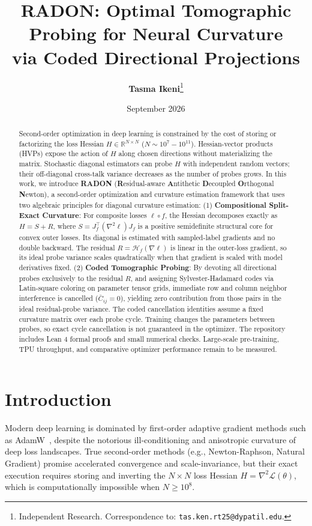 \documentclass[11pt,a4paper]{article}
\title{\textbf{RADON: Optimal Tomographic Probing for Neural Curvature\\via Coded Directional Projections}}
\author{
  \textbf{Tasma Ikeni}\thanks{Independent Research. Correspondence to: \texttt{tas.ken.rt25@dypatil.edu}.}
}
\date{September 2026}
\theoremstyle{definition}
\theoremstyle{remark}
\begin{document}
\maketitle

\begin{abstract}
Second-order optimization in deep learning is constrained by the cost of storing or factorizing the loss Hessian $H \in \mathbb{R}^{N \times N}$ ($N \sim 10^7 - 10^{11}$). Hessian-vector products (HVPs) expose the action of $H$ along chosen directions without materializing the matrix. Stochastic diagonal estimators can probe $H$ with independent random vectors; their off-diagonal cross-talk variance decreases as the number of probes grows.
In this work, we introduce \textbf{RADON} (\textbf{R}esidual-aware \textbf{A}ntithetic \textbf{D}ecoupled \textbf{O}rthogonal \textbf{N}ewton), a second-order optimization and curvature estimation framework that uses two algebraic principles for diagonal curvature estimation:
(1) \textbf{Compositional Split-Exact Curvature}: For composite losses $\ell \circ f$, the Hessian decomposes exactly as $H = S + R$, where $S = J_f^\top (\nabla^2 \ell) J_f$ is a positive semidefinite structural core for convex outer losses. Its diagonal is estimated with sampled-label gradients and no double backward. The residual $R = \mathcal{H}_f(\nabla \ell)$ is linear in the outer-loss gradient, so its ideal probe variance scales quadratically when that gradient is scaled with model derivatives fixed.
(2) \textbf{Coded Tomographic Probing}: By devoting all directional probes exclusively to the residual $R$, and assigning Sylvester-Hadamard codes via Latin-square coloring on parameter tensor grids, immediate row and column neighbor interference is cancelled ($\bar{C}_{ij} = 0$), yielding zero contribution from those pairs in the ideal residual-probe variance.
The coded cancellation identities assume a fixed curvature matrix over each probe cycle. Training changes the parameters between probes, so exact cycle cancellation is not guaranteed in the optimizer. The repository includes Lean 4 formal proofs and small numerical checks. Large-scale pre-training, TPU throughput, and comparative optimizer performance remain to be measured.
\end{abstract}

\section{Introduction}

Modern deep learning is dominated by first-order adaptive gradient methods such as AdamW~\cite{loshchilov2018decoupled}, despite the notorious ill-conditioning and anisotropic curvature of deep loss landscapes. True second-order methods (e.g., Newton-Raphson, Natural Gradient) promise accelerated convergence and scale-invariance, but their exact execution requires storing and inverting the $N \times N$ loss Hessian $H = \nabla^2 \mathcal{L}(\theta)$, which is computationally impossible when $N \ge 10^8$.
\end{document}
